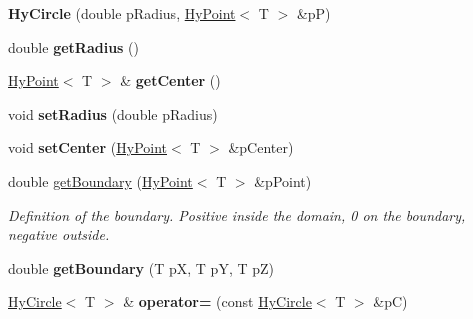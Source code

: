 \begin{DoxyCompactItemize}
\item 
\hypertarget{classHyCircle_adc55ea1795d45073c90c462bda267e6f}{
{\bfseries HyCircle} (double pRadius, \hyperlink{classHyPoint}{HyPoint}$<$ T $>$ \&pP)}
\label{classHyCircle_adc55ea1795d45073c90c462bda267e6f}

\item 
\hypertarget{classHyCircle_aa730543a6c7b464024fc530cf49e3c28}{
double {\bfseries getRadius} ()}
\label{classHyCircle_aa730543a6c7b464024fc530cf49e3c28}

\item 
\hypertarget{classHyCircle_a06295a19bea9a4afef499d10b7edb5fd}{
\hyperlink{classHyPoint}{HyPoint}$<$ T $>$ \& {\bfseries getCenter} ()}
\label{classHyCircle_a06295a19bea9a4afef499d10b7edb5fd}

\item 
\hypertarget{classHyCircle_a47d49ab084e13d1af2f6b8b7d8d3fdc0}{
void {\bfseries setRadius} (double pRadius)}
\label{classHyCircle_a47d49ab084e13d1af2f6b8b7d8d3fdc0}

\item 
\hypertarget{classHyCircle_a69ada2f6b472a1f1f7ecefa0d94210ec}{
void {\bfseries setCenter} (\hyperlink{classHyPoint}{HyPoint}$<$ T $>$ \&pCenter)}
\label{classHyCircle_a69ada2f6b472a1f1f7ecefa0d94210ec}

\item 
double \hyperlink{classHyCircle_aed6e84c3e2e99b8f84aa1b723224f4c5}{getBoundary} (\hyperlink{classHyPoint}{HyPoint}$<$ T $>$ \&pPoint)
\begin{DoxyCompactList}\small\item\em Definition of the boundary. Positive inside the domain, 0 on the boundary, negative outside. \item\end{DoxyCompactList}\item 
\hypertarget{classHyCircle_a08ababcaa26c11288e66a66a3d0e7f38}{
double {\bfseries getBoundary} (T pX, T pY, T pZ)}
\label{classHyCircle_a08ababcaa26c11288e66a66a3d0e7f38}

\item 
\hypertarget{classHyCircle_aeed0b7d097fbd97cfe87c8f7dc4e0b52}{
\hyperlink{classHyCircle}{HyCircle}$<$ T $>$ \& {\bfseries operator=} (const \hyperlink{classHyCircle}{HyCircle}$<$ T $>$ \&pC)}
\label{classHyCircle_aeed0b7d097fbd97cfe87c8f7dc4e0b52}

\end{DoxyCompactItemize}
